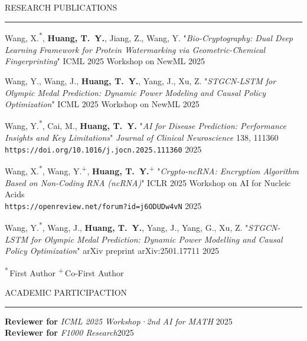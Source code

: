 \documentclass{resume} %
\renewenvironment{rSection}[1]{
\sectionskip
\textcolor{TsinghuaPurple}{\MakeUppercase{#1}}
\sectionlineskip
\hrule
\begin{list}{}{
\setlength{\leftmargin}{0em}
}
\item[]
}{
\end{list}
}
\begin{document}
\begin{rSection}{Research Publications}\itemsep -3pt         

{Wang, X.\textsuperscript{*}, \textbf{Huang, T.~Y.}, Jiang, Z., Wang, Y.  
"\textit{Bio\mbox{-}Cryptography: Dual Deep Learning Framework for Protein Watermarking via Geometric\mbox{-}Chemical Fingerprinting}"  
ICML 2025 Workshop on NewML} \hfill 2025 

{Wang, Y., Wang, J., \textbf{Huang, T.~Y.}, Yang, J., Xu, Z.  
"\textit{STGCN\mbox{-}LSTM for Olympic Medal Prediction: Dynamic Power Modeling and Causal Policy Optimization}"  
ICML 2025 Workshop on NewML} \hfill 2025 

{Wang, Y.\textsuperscript{*}, Cai, M., \textbf{Huang, T.~Y.}  
"\textit{AI for Disease Prediction: Performance Insights and Key Limitations}"  
\textit{Journal of Clinical Neuroscience} 138, 111360}\\
\texttt{https://doi.org/10.1016/j.jocn.2025.111360} \hfill 2025 

{Wang, X.\textsuperscript{*}, Wang, Y.\textsuperscript{+}, \textbf{Huang, T.~Y.}\textsuperscript{+}  
"\textit{Crypto\mbox{-}ncRNA: Encryption Algorithm Based on Non\mbox{-}Coding RNA (ncRNA)}"  
ICLR 2025 Workshop on AI for Nucleic Acids}\\
\texttt{https://openreview.net/forum?id=j6ODUDw4vN} \hfill 2025 

{Wang, Y.\textsuperscript{*}, Wang, J., \textbf{Huang, T.~Y.}, Yang, J., Yang, G., Xu, Z.  
"\textit{STGCN\mbox{-}LSTM for Olympic Medal Prediction: Dynamic Power Modelling and Causal Policy Optimization}"  
arXiv preprint arXiv:2501.17711} \hfill 2025 

\end{rSection}
{\footnotesize \textsuperscript{*}\,First Author \quad \textsuperscript{+}\,Co-First Author}

\begin{rSection}{ACADEMIC PARTICIPACTION}\itemsep -3pt

{\bf Reviewer for} \textit{ICML 2025 Workshop·2nd AI for MATH} \hfill 2025\\
{\bf Reviewer for} \textit{F1000 Research}\hfill 2025
\end{rSection}
\end{document}
